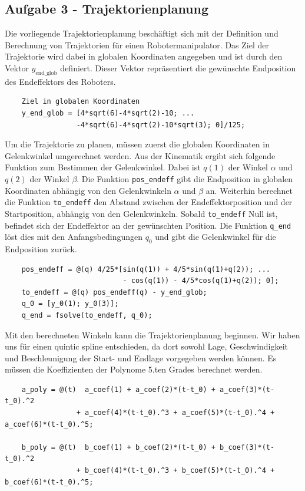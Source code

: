 \subsection*{Aufgabe 3 - Trajektorienplanung}


Die vorliegende Trajektorienplanung beschäftigt sich mit der Definition und Berechnung von Trajektorien für einen Robotermanipulator. Das Ziel der Trajektorie wird dabei in globalen Koordinaten angegeben und ist durch den Vektor \( y_{\text{end\_glob}} \) definiert. Dieser Vektor repräsentiert die gewünschte Endposition des Endeffektors des Roboters.

\begin{verbatim}
    Ziel in globalen Koordinaten
    y_end_glob = [4*sqrt(6)-4*sqrt(2)-10; ...
                 -4*sqrt(6)-4*sqrt(2)-10*sqrt(3); 0]/125;
\end{verbatim}

Um die Trajektorie zu planen, müssen zuerst die globalen Koordinaten in Gelenkwinkel umgerechnet werden. Aus der Kinematik ergibt sich folgende Funktion zum Bestimmen der Gelenkwinkel. Dabei ist \(q(1)\) der Winkel \(\alpha\) und \(q(2)\) der Winkel \(\beta\). Die Funktion \texttt{pos\_endeff} gibt die Endposition in globalen Koordinaten abhängig von den Gelenkwinkeln \(\alpha\) und \(\beta\) an.  Weiterhin berechnet die Funktion \texttt{to\_endeff} den Abstand zwischen der Endeffektorposition und der Startposition, abhängig von den Gelenkwinkeln. Sobald \texttt{to\_endeff} Null ist, befindet sich der Endeffektor an der gewünschten Position. Die Funktion \texttt{q\_end} löst dies mit den Anfangsbedingungen \(q_0\) und gibt die Gelenkwinkel für die Endposition zurück.

\begin{verbatim}
    pos_endeff = @(q) 4/25*[sin(q(1)) + 4/5*sin(q(1)+q(2)); ...
                            - cos(q(1)) - 4/5*cos(q(1)+q(2)); 0];
    to_endeff = @(q) pos_endeff(q) - y_end_glob;
    q_0 = [y_0(1); y_0(3)];
    q_end = fsolve(to_endeff, q_0);
\end{verbatim}

Mit den berechneten Winkeln kann die Trajektorienplanung beginnen. Wir haben uns für einen quintic spline entschieden, da dort sowohl Lage, Geschwindigkeit und Beschleunigung der Start- und Endlage vorgegeben werden können.
 Es müssen die Koeffizienten der Polynome 5.ten Grades berechnet werden.

 \begin{verbatim}
    a_poly = @(t)  a_coef(1) + a_coef(2)*(t-t_0) + a_coef(3)*(t-t_0).^2 
                 + a_coef(4)*(t-t_0).^3 + a_coef(5)*(t-t_0).^4 + a_coef(6)*(t-t_0).^5;
   
    b_poly = @(t)  b_coef(1) + b_coef(2)*(t-t_0) + b_coef(3)*(t-t_0).^2
                 + b_coef(4)*(t-t_0).^3 + b_coef(5)*(t-t_0).^4 + b_coef(6)*(t-t_0).^5;
\end{verbatim}


